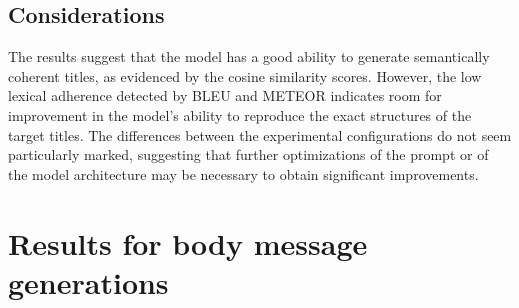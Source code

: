 \subsection{Considerations}
The results suggest that the model has a good ability to generate semantically coherent titles, as evidenced by the cosine similarity scores. However, the low lexical adherence detected by BLEU and METEOR indicates room for improvement in the model's ability to reproduce the exact structures of the target titles. The differences between the experimental configurations do not seem particularly marked, suggesting that further optimizations of the prompt or of the model architecture may be necessary to obtain significant improvements.
\section{Results for body message generations}